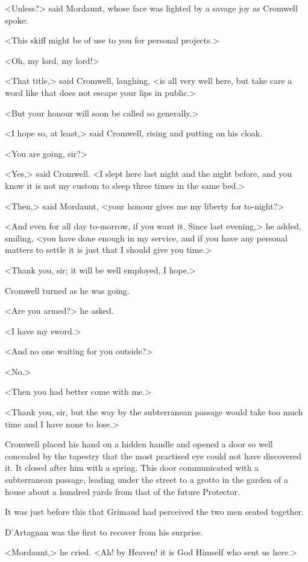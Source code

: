<Unless?> said Mordaunt, whose face was lighted by a savage joy as Cromwell spoke:

<This skiff might be of use to you for personal projects.>

<Oh, my lord, my lord!>

<That title,> said Cromwell, laughing, <is all very well here, but take care a word like that does not escape your lips in public.>

<But your honour will soon be called so generally.>

<I hope so, at least,> said Cromwell, rising and putting on his cloak.

<You are going, sir?>

<Yes,> said Cromwell. <I slept here last night and the night before, and you know it is not my custom to sleep three times in the same bed.>

<Then,> said Mordaunt, <your honour gives me my liberty for to-night?>

<And even for all day to-morrow, if you want it. Since last evening,> he added, smiling, <you have done enough in my service, and if you have any personal matters to settle it is just that I should give you time.>

<Thank you, sir; it will be well employed, I hope.>

Cromwell turned as he was going.

<Are you armed?> he asked.

<I have my sword.>

<And no one waiting for you outside?>

<No.>

<Then you had better come with me.>

<Thank you, sir, but the way by the subterranean passage would take too much time and I have none to lose.>

Cromwell placed his hand on a hidden handle and opened a door so well concealed by the tapestry that the most practised eye could not have discovered it. It closed after him with a spring. This door communicated with a subterranean passage, leading under the street to a grotto in the garden of a house about a hundred yards from that of the future Protector.

It was just before this that Grimaud had perceived the two men seated together.

D'Artagnan was the first to recover from his surprise.

<Mordaunt,> he cried. <Ah! by Heaven! it is God Himself who sent us here.>


